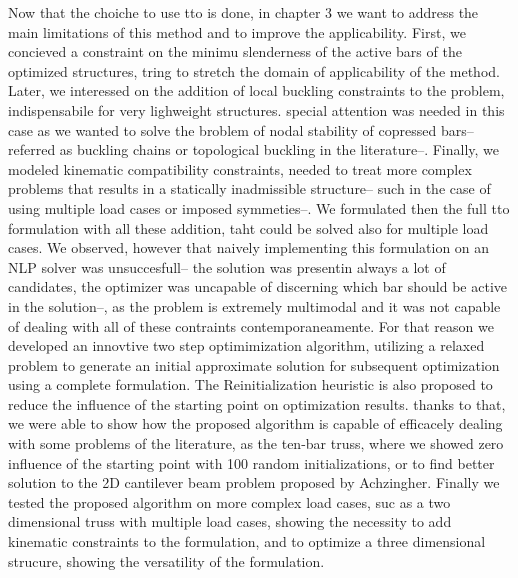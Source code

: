 Now that the choiche to use tto is done, in chapter 3 we want to address the main limitations of this method and to improve the applicability. First, we concieved a constraint on the minimu slenderness of the active bars of the optimized structures, tring to stretch the domain of applicability of the method. Later, we interessed on the addition of local buckling constraints to the problem, indispensabile for very lighweight structures. special attention was needed in this case as we wanted to solve the broblem of nodal stability of copressed bars--referred as buckling chains or topological buckling in the literature--. Finally, we modeled kinematic compatibility constraints, needed to treat more complex problems that results in a statically inadmissible structure-- such in the case of using multiple load cases or imposed symmeties--. We formulated then the full tto formulation with all these addition, taht could be solved also for multiple load cases. We observed, however that naively implementing this formulation on an NLP solver  was unsuccesfull-- \ie the solution was presentin always a lot of candidates, the optimizer was uncapable of discerning which bar should be active in the solution--, as the problem is extremely multimodal and it was not capable of dealing with all of these contraints contemporaneamente. For that reason we developed an innovtive two step optimimization algorithm, utilizing a relaxed problem to generate an initial approximate solution for subsequent optimization using a complete formulation. The Reinitialization heuristic is also proposed to reduce the influence of the starting point on optimization results. thanks to that, we were able to show how the proposed algorithm is capable of efficacely dealing with some problems of the literature, as the ten-bar truss, where we showed zero influence of the starting point with 100 random initializations, or to find better solution to the 2D cantilever beam problem proposed by Achzingher. Finally we tested the proposed algorithm on more complex load cases, suc as a two dimensional truss with multiple load cases, showing the necessity to add kinematic constraints to the formulation, and to optimize a three dimensional strucure, showing the versatility of the formulation.

